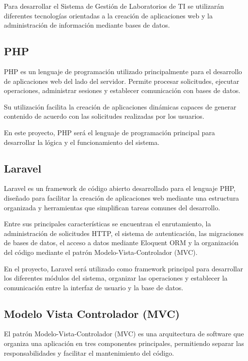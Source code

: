 Para desarrollar el Sistema de Gestión de Laboratorios de TI se utilizarán diferentes tecnologías orientadas a la creación de aplicaciones web y la administración de información mediante bases de datos.

\subsection{PHP}

PHP es un lenguaje de programación utilizado principalmente para el desarrollo de aplicaciones web del lado del servidor. Permite procesar solicitudes, ejecutar operaciones, administrar sesiones y establecer comunicación con bases de datos.

Su utilización facilita la creación de aplicaciones dinámicas capaces de generar contenido de acuerdo con las solicitudes realizadas por los usuarios.

En este proyecto, PHP será el lenguaje de programación principal para desarrollar la lógica y el funcionamiento del sistema.

\subsection{Laravel}

Laravel es un framework de código abierto desarrollado para el lenguaje PHP, diseñado para facilitar la creación de aplicaciones web mediante una estructura organizada y herramientas que simplifican tareas comunes del desarrollo.

Entre sus principales características se encuentran el enrutamiento, la administración de solicitudes HTTP, el sistema de autenticación, las migraciones de bases de datos, el acceso a datos mediante Eloquent ORM y la organización del código mediante el patrón Modelo-Vista-Controlador (MVC).

En el proyecto, Laravel será utilizado como framework principal para desarrollar los diferentes módulos del sistema, organizar las operaciones y establecer la comunicación entre la interfaz de usuario y la base de datos.

\subsection{Modelo Vista Controlador (MVC)}

El patrón Modelo-Vista-Controlador (MVC) es una arquitectura de software que organiza una aplicación en tres componentes principales, permitiendo separar las responsabilidades y facilitar el mantenimiento del código.

